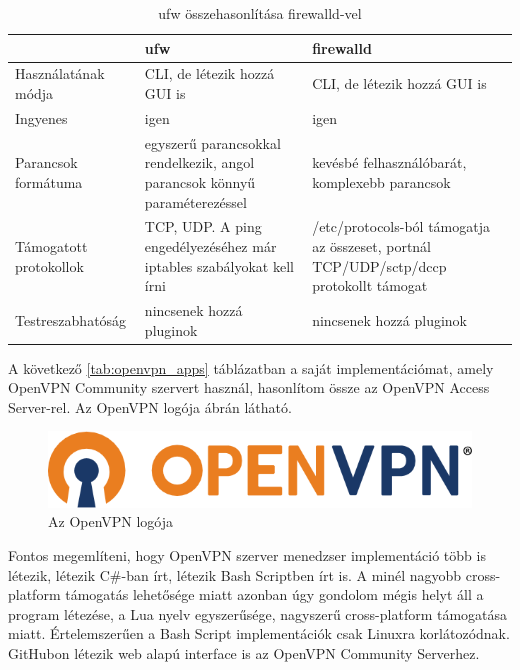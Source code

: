 	\begin{table}[h]
	\centering
	\caption{ufw összehasonlítása firewalld-vel}
	\label{tab:ufw_vs_firewalld}
	\begin{tabularx}{\linewidth}{l|X|X}
	 & ufw & firewalld \\
	\hline
	Használatának módja & CLI, de létezik hozzá GUI is & CLI, de létezik hozzá GUI is \\
	\hline
	Ingyenes & igen & igen \\
	\hline
	Parancsok formátuma & egyszerű parancsokkal rendelkezik, angol parancsok könnyű paraméterezéssel \cite{ufw} & kevésbé felhasználóbarát, komplexebb parancsok \cite{firewalld_man}\\
	\hline
	Támogatott protokollok & TCP, UDP. A ping engedélyezéséhez már iptables szabályokat kell írni & /etc/protocols-ból támogatja az összeset, portnál TCP/UDP/sctp/dccp protokollt támogat \\
	\hline
	Testreszabhatóság & nincsenek hozzá pluginok & nincsenek hozzá pluginok \\
	\end{tabularx}
	\end{table}
	
\pagebreak

A következő \ref{tab:openvpn_apps} táblázatban a saját implementációmat, amely OpenVPN Community szervert használ, hasonlítom össze az OpenVPN Access Server-rel. Az OpenVPN logója  ábrán látható.

\begin{figure}[h]
\centering
\includegraphics[scale=0.5]{images/openvpn-logo.png}
\caption{Az OpenVPN logója \cite{openvpn_logo}}
\label{fig:openvpn_logo}
\end{figure}

Fontos megemlíteni, hogy OpenVPN szerver menedzser implementáció több is létezik, létezik C\#-ban írt, létezik Bash Scriptben írt is. A minél nagyobb cross-platform támogatás lehetősége miatt azonban úgy gondolom mégis helyt áll a program létezése, a Lua nyelv egyszerűsége, nagyszerű cross-platform támogatása miatt. Értelemszerűen a Bash Script implementációk csak Linuxra korlátozódnak. GitHubon létezik web alapú interface is az OpenVPN Community Serverhez.

